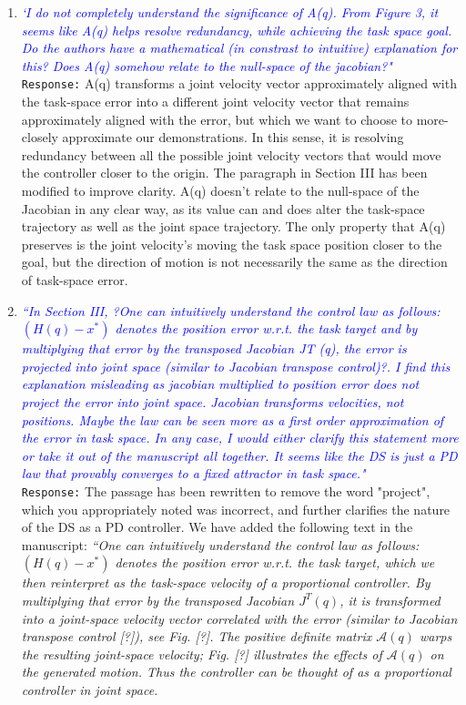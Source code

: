 \documentclass{article}
\begin{document}
\begin{enumerate}
\item \textcolor{blue}{\textit{`I do not completely understand the significance of A(q). From Figure 3, it seems like A(q) helps resolve
redundancy, while achieving the task space goal. Do the authors have a mathematical (in constrast to
intuitive) explanation for this? Does A(q) somehow relate to the null-space of the jacobian?"}}\\
\texttt{Response:} \small A(q) transforms a joint velocity vector approximately aligned with the task-space error into a different joint velocity vector that remains approximately aligned with the error, but which we want to choose to more-closely approximate our demonstrations. In this sense, it is resolving redundancy between all the possible joint velocity vectors that would move the controller closer to the origin. The paragraph in Section III has been modified to improve clarity. A(q) doesn't relate to the null-space of the Jacobian in any clear way, as its value can and does alter the task-space trajectory as well as the joint space trajectory. The only property that A(q) preserves is the joint velocity's moving the task space position closer to the goal, but the direction of motion is not necessarily the same as the direction of task-space error.\\

\item \textcolor{blue}{\textit{``In Section III, ?One can intuitively understand the control law as follows:$(H(q) - x^*)$ denotes the
position error w.r.t. the task target and by multiplying that error by the transposed Jacobian JT (q),
the error is projected into joint space (similar to Jacobian transpose control)?. I find this explanation
misleading as jacobian multiplied to position error does not project the error into joint space. Jacobian
transforms velocities, not positions. Maybe the law can be seen more as a first order approximation
of the error in task space. In any case, I would either clarify this statement more or take it out of the
manuscript all together. It seems like the DS is just a PD law that provably converges to a fixed attractor
in task space."}}\\
\texttt{Response:} \small The passage has been rewritten to remove the word "project", which you appropriately noted was incorrect, and further clarifies the nature of the DS as a PD controller. We have added the following text in the manuscript: 
\textit{``One can intuitively understand the control law as follows: $(H(q) - x^*)$ denotes the position error w.r.t. the task target, which we then reinterpret as the task-space velocity of a proportional controller. By multiplying that error by the transposed Jacobian $J^T(q)$, it is transformed into a joint-space velocity vector correlated with the error (similar to Jacobian transpose control [?]), see Fig. [?]. The positive definite matrix $\mathcal{A}(q)$ warps the resulting joint-space velocity; Fig. [?] illustrates the effects of  $\mathcal{A}(q)$ on the generated motion. Thus the controller can be thought of as a proportional controller in joint space.}\\


\end{enumerate}
\end{document}
